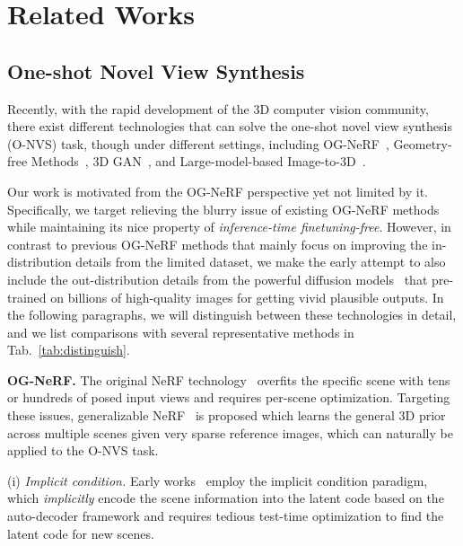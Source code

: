 \section{\textbf{Related Works}}
\label{sec:related_work}
\subsection{\textbf{One-shot Novel View Synthesis}}
Recently, with the rapid development of the 3D computer vision community, there exist different technologies that can solve the one-shot novel view synthesis (O-NVS) task, though under different settings, including {OG-NeRF}~\cite{PixelNeRF_yu2021pixelnerf,FE_NVS_guo2022fast,lin2023visionnerf,gu2023nerfdiff}, {Geometry-free Methods}~\cite{sitzmann2021LFN,srt22,watson20223DiM}, {3D GAN}~\cite{PiGAN_chan2021pi,Pix2NeRF_cai2022pix2nerf,chan2022EG3D},  and {Large-model-based Image-to-3D}~\cite{Xu_2022_SinNeRF,Jain_2021_ICCV_dietnerf,liu2023zero123,tang2023makeit3d}. 

Our work is motivated from the OG-NeRF perspective yet not limited by it. Specifically, we target relieving the blurry issue of existing OG-NeRF methods while maintaining its nice property of \textit{inference-time finetuning-free}. However, in contrast to previous OG-NeRF methods that mainly focus on improving the in-distribution details from the limited dataset, we make the early attempt to also include the out-distribution details from the powerful diffusion models~\cite{rombach2022LatentDiff,zhang2023addingControlNet} that pre-trained on billions of high-quality images for getting vivid plausible outputs.
In the following paragraphs, we will distinguish between these technologies in detail, and we list comparisons with several representative methods in Tab.~\ref{tab:distinguish}.

\vspace{0.1cm}
\noindent\textbf{OG-NeRF.}
The original NeRF technology~\cite{NeRF_mildenhall2020nerf} overfits the specific scene with tens or hundreds of posed input views and requires per-scene optimization. Targeting these issues, generalizable NeRF~\cite{PixelNeRF_yu2021pixelnerf,FE_NVS_guo2022fast,lin2023visionnerf} is proposed which learns the general 3D prior across multiple scenes given very sparse reference images, which can naturally be applied to the O-NVS task. 


(i) \textit{Implicit condition.} Early works~\cite{CodeNeRF_jang2021codenerf,ShaRF_rematas2021sharf} employ the implicit condition paradigm, which \textit{implicitly} encode the scene information into the latent code based on the auto-decoder framework and requires tedious test-time optimization to find the latent code for new scenes. 



